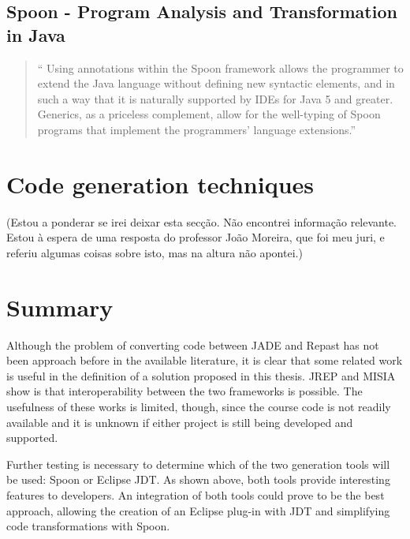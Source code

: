 \subsection{Spoon - Program Analysis and Transformation in Java}
\begin{quote}
	`` Using annotations within the Spoon framework allows the programmer to extend the Java language without defining new syntactic elements, and in such a way that it is naturally supported by IDEs for Java 5 and greater. Generics, as a priceless complement, allow for the well-typing of Spoon programs that implement the programmers' language extensions.'' \cite{eclipseJDT}
\end{quote}




\section{Code generation techniques}
(Estou a ponderar se irei deixar esta secção. Não encontrei informação relevante. Estou à espera de uma resposta do professor João Moreira, que foi meu juri, e referiu algumas coisas sobre isto, mas na altura não apontei.)


\section{Summary}
Although the problem of converting code between JADE and Repast has not been approach before in the available literature, it is clear that some related work is useful in the definition of a solution proposed in this thesis. JREP and MISIA show is that interoperability between the two frameworks is possible. The usefulness of these works is limited, though, since the course code is not readily available and it is unknown if either project is still being developed and supported.

Further testing is necessary to determine which of the two generation tools will be used: Spoon or Eclipse JDT. As shown above, both tools provide interesting features to developers. An integration of both tools could prove to be the best approach, allowing the creation of an Eclipse plug-in with JDT and simplifying code transformations with Spoon.


